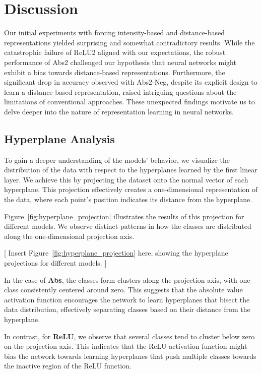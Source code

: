 \section{Discussion}
Our initial experiments with forcing intensity-based and distance-based representations yielded surprising and somewhat contradictory results. While the catastrophic failure of ReLU2 aligned with our expectations, the robust performance of Abs2 challenged our hypothesis that neural networks might exhibit a bias towards distance-based representations.  Furthermore, the significant drop in accuracy observed with Abs2-Neg, despite its explicit design to learn a distance-based representation, raised intriguing questions about the limitations of conventional approaches. These unexpected findings motivate us to delve deeper into the nature of representation learning in neural networks.



\subsection{Hyperplane Analysis}

To gain a deeper understanding of the models' behavior, we visualize the distribution of the data with respect to the hyperplanes learned by the first linear layer. We achieve this by projecting the dataset onto the normal vector of each hyperplane. This projection effectively creates a one-dimensional representation of the data, where each point's position indicates its distance from the hyperplane.

Figure~\ref{fig:hyperplane_projection} illustrates the results of this projection for different models.  We observe distinct patterns in how the classes are distributed along the one-dimensional projection axis.

[ Insert Figure~\ref{fig:hyperplane_projection} here, showing the hyperplane projections for different models. ]

In the case of \textbf{Abs}, the classes form clusters along the projection axis, with one class consistently centered around zero. This suggests that the absolute value activation function encourages the network to learn hyperplanes that bisect the data distribution, effectively separating classes based on their distance from the hyperplane.

In contrast, for \textbf{ReLU}, we observe that several classes tend to cluster below zero on the projection axis. This indicates that the ReLU activation function might bias the network towards learning hyperplanes that push multiple classes towards the inactive region of the ReLU function.


